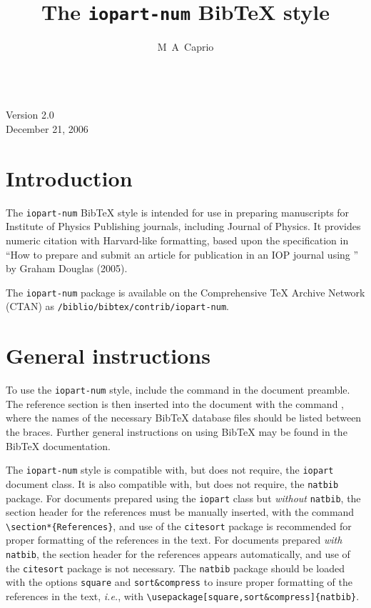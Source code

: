 \documentclass[12pt]{iopart}
\newcommand{\BibTeX}{Bib\TeX}
\begin{document}
\nocite{*}

\title{The \texttt{iopart-num} \BibTeX{} style}

\noindent \qquad \\[-6pt] \qquad Version 2.0\\\qquad December 21, 2006

\author{M~A~Caprio}

\address{Center for Theoretical Physics, Sloane Physics Laboratory, 
Yale University, New Haven, Connecticut 06520-8120, USA}

\section{Introduction}

The \texttt{iopart-num} \BibTeX{} style is intended for use in
preparing manuscripts for Institute of Physics Publishing journals,
including Journal of Physics.  It provides numeric citation with
Harvard-like formatting, based upon the specification in ``How to
prepare and submit an article for publication in an IOP journal using
\LaTeXe'' by Graham Douglas (2005).

The \texttt{iopart-num} package is available on the Comprehensive
\TeX{} Archive Network (CTAN) as \texttt{/biblio/bibtex/contrib/iopart-num}.

\section{General instructions}

To use the \texttt{iopart-num} style, include the command
\verb++ in the
document preamble.  The reference section is then inserted into the
document with the command \verb++, where the names
of the necessary \BibTeX{} database files should be listed between the
braces.  Further general instructions on using \BibTeX{} may be found
in the \BibTeX{} documentation.

The \texttt{iopart-num} style is compatible with, but does not
require, the \texttt{iopart} document class.  It is also compatible
with, but does not require, the \texttt{natbib} package.  For
documents prepared using the \texttt{iopart} class but
\textit{without} \texttt{natbib}, the section header 
for the references must be manually inserted, with the command
\verb+\section*{References}+, and use of the \texttt{citesort} package
is recommended for proper formatting of the references in the text.
For documents prepared \textit{with}
\texttt{natbib}, the section header for the references appears automatically, 
and use of the \texttt{citesort} package is not necessary.  The
\texttt{natbib} package should be loaded with the options \verb+square+ and \verb+sort&compress+
to insure proper formatting of the references in the text,
\textit{i.e.}, with \verb+\usepackage[square,sort&compress]{natbib}+.
\end{document}
